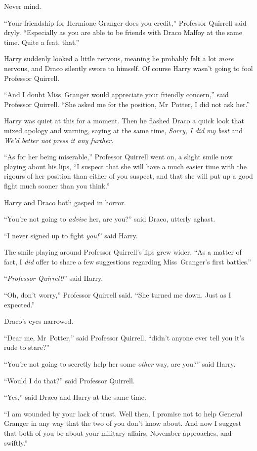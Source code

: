 Never mind.

“Your friendship for Hermione Granger does you credit,” Professor Quirrell said dryly. “Especially as you are able to be friends with Draco Malfoy at the same time. Quite a feat, that.”

Harry suddenly looked a little nervous, meaning he probably felt a lot \emph{more} nervous, and Draco silently swore to himself. Of course Harry wasn’t going to fool Professor Quirrell.

“And I doubt Miss~Granger would appreciate your friendly concern,” said Professor Quirrell. “She asked me for the position, Mr~Potter, I did not ask her.”

Harry was quiet at this for a moment. Then he flashed Draco a quick look that mixed apology and warning, saying at the same time, \emph{Sorry, I did my best} and \emph{We’d better not press it any further.}

“As for her being miserable,” Professor Quirrell went on, a slight smile now playing about his lips, “I suspect that she will have a much easier time with the rigours of her position than either of you suspect, and that she will put up a good fight much sooner than you think.”

Harry and Draco both gasped in horror.

“You’re not going to \emph{advise} her, are you?” said Draco, utterly aghast.

“I never signed up to fight \emph{you!}” said Harry.

The smile playing around Professor Quirrell’s lips grew wider. “As a matter of fact, I \emph{did} offer to share a few suggestions regarding Miss~Granger’s first battles.”

“\emph{Professor Quirrell!}” said Harry.

“Oh, don’t worry,” Professor Quirrell said. “She turned me down. Just as I expected.”

Draco’s eyes narrowed.

“Dear me, Mr~Potter,” said Professor Quirrell, “didn’t anyone ever tell you it’s rude to stare?”

“You’re not going to secretly help her some \emph{other} way, are you?” said Harry.

“Would I do that?” said Professor Quirrell.

“Yes,” said Draco and Harry at the same time.

“I am wounded by your lack of trust. Well then, I promise not to help General Granger in any way that the two of you don’t know about. And now I suggest that both of you be about your military affairs. November approaches, and swiftly.”

